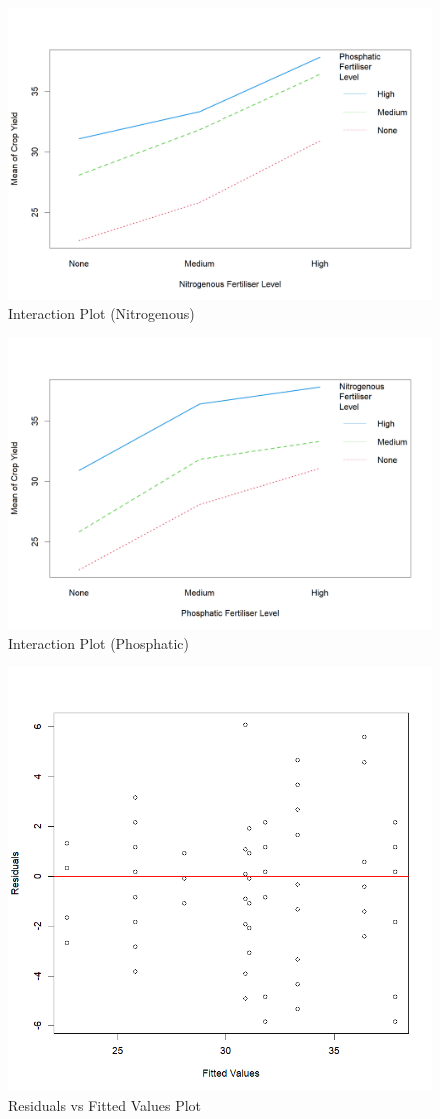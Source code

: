 \documentclass[12pt]{article}
\begin{document}
\begin{figure}[ht]
    \centering
    \includegraphics[width=0.8\linewidth]{Figures/Interaction Plot (Nitrogenous).png}
    \caption{Interaction Plot (Nitrogenous)}
\end{figure}

\begin{figure}[ht]
    \centering
    \includegraphics[width=0.8\linewidth]{Figures/Interaction Plot (Phosphatic).png}
    \caption{Interaction Plot (Phosphatic)}
\end{figure}

\begin{figure}[ht]
    \centering
    \includegraphics[width=0.8\linewidth]{Figures/Residual vs Fitted.png}
    \caption{Residuals vs Fitted Values Plot}
\end{figure}
\end{document}
